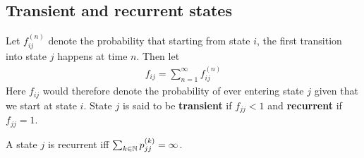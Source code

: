 \documentclass[a4paper,10pt,english]{article}
\begin{document}
\subsection{Transient and recurrent states}
Let $f_{ij}^{(n)}$ denote the probability that starting from state $i$, the first transition into state $j$ happens at time $n$. Then let
\begin{align*}f_{ij} = \sum_{n=1}^\infty f_{ij}^{(n)}\end{align*}
Here $f_{ij}$ would therefore denote the probability of ever entering state $j$ given that we start at state $i$. 
State $j$ is said to be \textbf{transient} if $f_{jj} < 1$ and \textbf{recurrent} if $f_{jj}=1$. 
\begin{prop}
A state $j$ is recurrent iff
$\sum_{k\in\mathbb{N}} p_{jj}^{(k)} = \infty$.
\end{prop}
\end{document}
